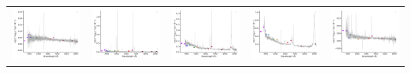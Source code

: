 \begin{center}
\begin{longtable}{l l l l l }
    \includegraphics[width=0.19\linewidth, clip]{Figs/Figs-sdss/spec-0914-52721-0103-SPLUS-n03s44-026823.pdf} & \includegraphics[width=0.19\linewidth, clip]{Figs/Figs-sdss/spec-0914-52721-0431-SPLUS-n03s43-048919.pdf} & \includegraphics[width=0.19\linewidth, clip]{Figs/Figs-sdss/spec-0981-52435-0575-STRIPE82-0102-040352.pdf} & \includegraphics[width=0.19\linewidth, clip]{Figs/Figs-sdss/spec-0982-52466-0091-STRIPE82-0103-087316.pdf} & \includegraphics[width=0.19\linewidth, clip]{Figs/Figs-sdss/spec-0982-52466-0477-STRIPE82-0103-089600.pdf} \\

\end{longtable}
\end{center}
